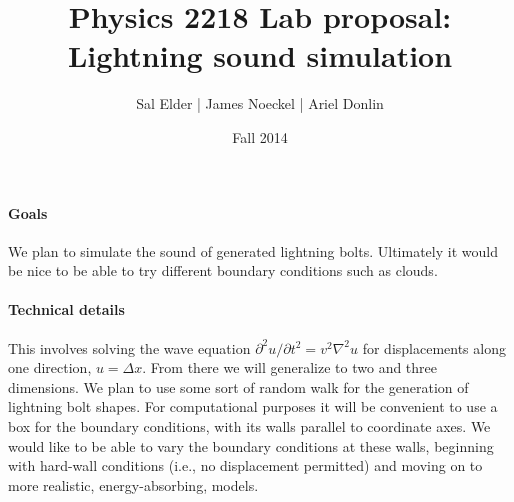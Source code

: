 \documentclass{article}
\title{Physics 2218 Lab proposal:\\ Lightning sound simulation}
\author{Sal Elder | James Noeckel | Ariel Donlin}
\date{Fall 2014}
\begin{document}
\maketitle
\paragraph {Goals} We plan to simulate the sound of generated lightning bolts. Ultimately it would be nice to be able to try different boundary conditions such as clouds.
\paragraph {Technical details} This involves solving the wave equation $\partial ^2u/\partial t^2=v^2\nabla ^2u$ for displacements along one direction, $u=\Delta x.$ From there we will generalize to two and three dimensions. We plan to use some sort of random walk for the generation of lightning bolt shapes. For computational purposes it will be convenient to use a box for the boundary conditions, with its walls parallel to coordinate axes. We would like to be able to vary the boundary conditions at these walls, beginning with hard-wall conditions (i.e., no displacement permitted) and moving on to more realistic, energy-absorbing, models.
\end{document}
